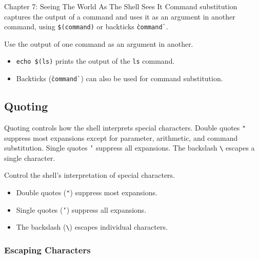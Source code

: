 \begin{notes}{Chapter 7: Seeing The World As The Shell Sees It}
    Command substitution captures the output of a command and uses it as an argument in another command, using \texttt{\$(command)} or backticks \texttt{\`command\`}.
    
    \begin{highlight}
    
    Use the output of one command as an argument in another.
    
    \begin{itemize}
        \item \texttt{echo \$(ls)} prints the output of the \texttt{ls} command.
        \item Backticks (\texttt{\`command\`}) can also be used for command substitution.
    \end{itemize}
    
    \end{highlight}
    
    \subsection*{Quoting}
    
    Quoting controls how the shell interprets special characters. Double quotes \texttt{"} suppress most expansions except for parameter, arithmetic, and command substitution. Single quotes \texttt{'} 
    suppress all expansions. The backslash \texttt{\textbackslash} escapes a single character.
    
    \begin{highlight}[Quoting]
    
    Control the shell's interpretation of special characters.
    
    \begin{itemize}
        \item Double quotes (\texttt{"}) suppress most expansions.
        \item Single quotes (\texttt{'}) suppress all expansions.
        \item The backslash (\texttt{\textbackslash}) escapes individual characters.
    \end{itemize}
    
    \end{highlight}
    
    \subsubsection*{Escaping Characters}
    

\end{notes}
